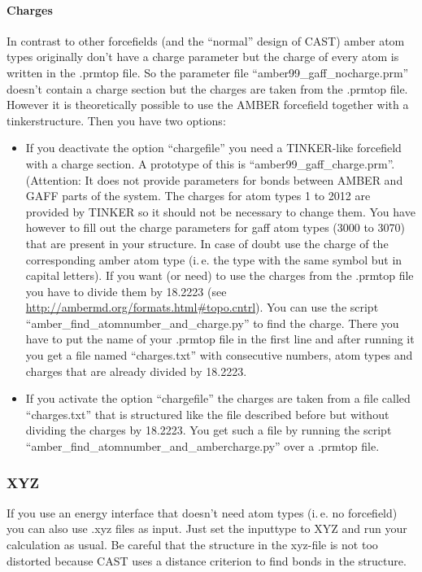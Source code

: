 \documentclass[10pt,a4paper]{article} %
\begin{document}
\paragraph{Charges}

In contrast to other forcefields (and the ``normal'' design of CAST) amber atom types originally don't have a charge parameter but the charge of every atom is written in the .prmtop file. So the parameter file ``amber99\_gaff\_nocharge.prm'' doesn't contain a charge section but the charges are taken from the .prmtop file. However it is theoretically possible to use the AMBER forcefield together with a tinkerstructure. Then you have two options:
\begin{itemize}
\item If you deactivate the option ``chargefile'' you need a TINKER-like forcefield with a charge section. A prototype of this is ``amber99\_gaff\_charge.prm''. (Attention: It does not provide parameters for bonds between AMBER and GAFF parts of the system. The charges for atom types 1 to 2012 are provided by TINKER so it should not be necessary to change them. You have however to fill out the charge parameters for gaff atom types (3000 to 3070) that are present in your structure. In case of doubt use the charge of the corresponding amber atom type (i.\,e. the type with the same symbol but in capital letters). If you want (or need) to use the charges from the .prmtop file you have to divide them by 18.2223 (see \url{http://ambermd.org/formats.html\#topo.cntrl}). You can use the script ``amber\_find\_atomnumber\_and\_charge.py'' to find the charge. There you have to put the name of your .prmtop file in the first line and after running it you get a file named ``charges.txt'' with consecutive numbers, atom types and charges that are already divided by 18.2223.
\item If you activate the option ``chargefile'' the charges are taken from a file called ``charges.txt'' that is structured like the file described before but without dividing the charges by 18.2223. You get such a file by running the script ``amber\_find\_atomnumber\_and\_ambercharge.py'' over a .prmtop file.
\end{itemize}

\subsubsection{XYZ}

If you use an energy interface that doesn't need atom types (i.\,e. no forcefield) you can also use .xyz files as input. Just set the inputtype to XYZ and run your calculation as usual. Be careful that the structure in the xyz-file is not too distorted because CAST uses a distance criterion to find bonds in the structure.
\end{document}
